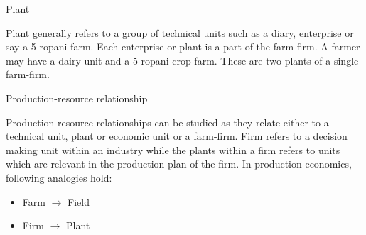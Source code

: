 \documentclass[12pt,ignorenonframetext,aspectratio=169]{beamer}
\begin{document}
\begin{frame}{}
\protect\hypertarget{section-3}{}

\begin{block}{Plant}

Plant generally refers to a group of technical units such as a diary,
enterprise or say a 5 ropani farm. Each enterprise or plant is a part of
the farm-firm. A farmer may have a dairy unit and a 5 ropani crop farm.
These are two plants of a single farm-firm.

\end{block}

\begin{block}{Production-resource relationship}

Production-resource relationships can be studied as they relate either
to a technical unit, plant or economic unit or a farm-firm. Firm refers
to a decision making unit within an industry while the plants within a
firm refers to units which are relevant in the production plan of the
firm. In production economics, following analogies hold:

\begin{itemize}
  \item Farm $\longrightarrow$ Field
  \item Firm $\longrightarrow$ Plant
  \end{itemize}

\end{block}

\end{frame}
\end{document}
